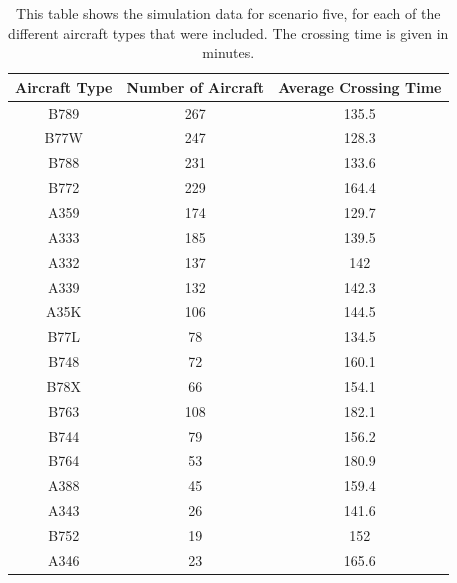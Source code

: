 \documentclass[stu, a4paper, 12pt, floatsintext]{apa7}
\numberwithin{figure}{section}
\numberwithin{table}{section}
\numberwithin{equation}{section}
\begin{document}
\begin{table}[H]
    \centering
    \caption{This table shows the simulation data for scenario five, for each of the different aircraft types that were included. The crossing time is given in minutes.}
    \label{tab:36}
    \begin{tabular}{@{}ccc@{}}
    \toprule
    \textbf{Aircraft Type} & \textbf{Number of Aircraft} & \textbf{Average Crossing Time} \\ \midrule
    B789                   & 267                         & 135.5                          \\
    B77W                   & 247                         & 128.3                          \\
    B788                   & 231                         & 133.6                          \\
    B772                   & 229                         & 164.4                          \\
    A359                   & 174                         & 129.7                          \\
    A333                   & 185                         & 139.5                          \\
    A332                   & 137                         & 142                            \\
    A339                   & 132                         & 142.3                          \\
    A35K                   & 106                         & 144.5                          \\
    B77L                   & 78                          & 134.5                          \\
    B748                   & 72                          & 160.1                          \\
    B78X                   & 66                          & 154.1                          \\
    B763                   & 108                         & 182.1                          \\
    B744                   & 79                          & 156.2                          \\
    B764                   & 53                          & 180.9                          \\
    A388                   & 45                          & 159.4                          \\
    A343                   & 26                          & 141.6                          \\
    B752                   & 19                          & 152                            \\
    A346                   & 23                          & 165.6                          \\ \bottomrule
    \end{tabular}
\end{table}
\end{document}
